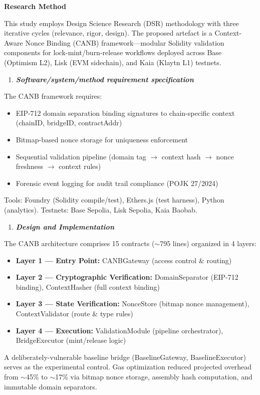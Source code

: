 \documentclass[
]{article}
\begin{document}
\textbf{Research Method}

This study employs Design Science Research (DSR) methodology with three iterative cycles (relevance, rigor, design). The proposed artefact is a Context-Aware Nonce Binding (CANB) framework---modular Solidity validation components for lock-mint/burn-release workflows deployed across Base (Optimism L2), Lisk (EVM sidechain), and Kaia (Klaytn L1) testnets.

\bigskip
\begin{enumerate}
\def\labelenumi{\arabic{enumi}.}
\item
  \emph{\textbf{Software/system/method requirement specification}}
\end{enumerate}

The CANB framework requires:
\begin{itemize}
  \item EIP-712 domain separation binding signatures to chain-specific context (chainID, bridgeID, contractAddr)
  \item Bitmap-based nonce storage for uniqueness enforcement
  \item Sequential validation pipeline (domain tag $\rightarrow$ context hash $\rightarrow$ nonce freshness $\rightarrow$ context rules)
  \item Forensic event logging for audit trail compliance (POJK 27/2024)
\end{itemize}
Tools: Foundry (Solidity compile/test), Ethers.js (test harness), Python (analytics). Testnets: Base Sepolia, Lisk Sepolia, Kaia Baobab.

\bigskip
\begin{enumerate}
\def\labelenumi{\arabic{enumi}.}
\setcounter{enumi}{1}
\item
  \emph{\textbf{Design and Implementation}}
\end{enumerate}

The CANB architecture comprises 15 contracts ($\sim$795 lines) organized in 4 layers:
\begin{itemize}
  \item \textbf{Layer 1 --- Entry Point:} CANBGateway (access control \& routing)
  \item \textbf{Layer 2 --- Cryptographic Verification:} DomainSeparator (EIP-712 binding), ContextHasher (full context binding)
  \item \textbf{Layer 3 --- State Verification:} NonceStore (bitmap nonce management), ContextValidator (route \& type rules)
  \item \textbf{Layer 4 --- Execution:} ValidationModule (pipeline orchestrator), BridgeExecutor (mint/release logic)
\end{itemize}
A deliberately-vulnerable baseline bridge (BaselineGateway, BaselineExecutor) serves as the experimental control. Gas optimization reduced projected overhead from $\sim$45\% to $\sim$17\% via bitmap nonce storage, assembly hash computation, and immutable domain separators.
\end{document}
